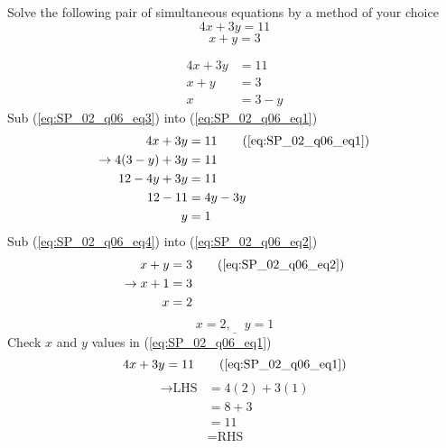 \question Solve the following pair of simultaneous equations by a method of 
your choice
\[
	4x + 3y = 11
\]
\[
	x + y = 3
\]
\begin{solution}
	\begin{align}
		4x + 3y 
			&= 11
			\label{eq:SP_02_q06_eq1} 
			\\
		x + y 
			&= 3
			\label{eq:SP_02_q06_eq2} 
			\\
		x 
			&= 3 - y
			\label{eq:SP_02_q06_eq3} 
	\end{align}
	Sub (\ref{eq:SP_02_q06_eq3}) into (\ref{eq:SP_02_q06_eq1})
	\noindent
	\begin{align}
		4x + 3y 
			&= 11 
			\nonumber \tag{\ref{eq:SP_02_q06_eq1}}
			\\
		\rightarrow 
		4(3-y) + 3y 
			&= 11 
			\nonumber
			\\
		12 - 4y + 3y 
			&= 11 
			\nonumber
			\\
		12 - 11 
			&= 4y - 3y
			\nonumber
			\\
		y
			&= 1 
			\label{eq:SP_02_q06_eq4}
	\end{align}
	Sub (\ref{eq:SP_02_q06_eq4}) into (\ref{eq:SP_02_q06_eq2})
	\begin{align*}
		x + y 
			&= 3
			\tag{\ref{eq:SP_02_q06_eq2}} \\
		\rightarrow
		x + 1
			&= 3 
			\\
		x 
			&= 2
	\end{align*}
	\[ 
		\underline{
			x = 2, \quad y = 1
		}
	\]
	Check $x$ and $y$ values in (\ref{eq:SP_02_q06_eq1})
	\[
		4x + 3y = 11 
		\tag{\ref{eq:SP_02_q06_eq1}}
	\]
	\begin{align*}
		\rightarrow 
		\text{LHS} 
			&= 4(2) + 3(1)
			\\
			&= 8 + 3
			\\
			&= 11
			\\
			&= \text{RHS}
	\end{align*}
\end{solution}

